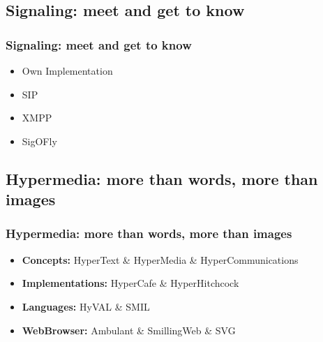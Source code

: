 \documentclass[t]{beamer}
\begin{document}
	\subsection{Signaling: meet and get to know}
  		\begin{frame}[c]
		\frametitle{Signaling: meet and get to know}
		\begin{itemize}
		\item Own Implementation
		\vfill
		\item SIP
		\vfill
		\item XMPP
		\vfill
		\item SigOFly
		\end{itemize}
		\end{frame}



	\subsection{Hypermedia: more than words, more than images}
  		\begin{frame}[c]
		\frametitle{Hypermedia: more than words, more than images}
		\begin{itemize}
		\item \textbf{Concepts:} HyperText \& HyperMedia \& HyperCommunications
		\vfill
		\item \textbf{Implementations:} HyperCafe \& HyperHitchcock  %
		\vfill
		\item \textbf{Languages:} HyVAL \& SMIL
		\vfill
		\item \textbf{WebBrowser:} Ambulant \& SmillingWeb \& SVG
		\end{itemize}
		\end{frame}
\end{document}
